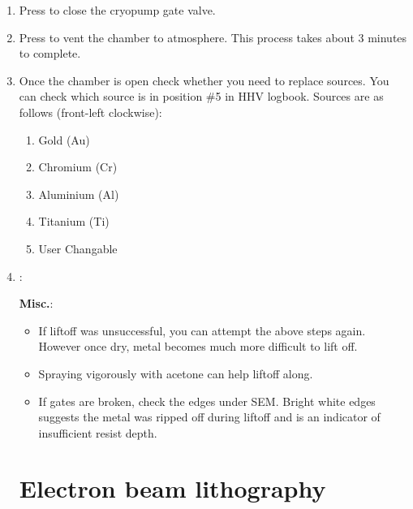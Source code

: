 \documentclass[12pt,a4paper]{report}
\begin{document}
\begin{enumerate}
\item Press  to close the cryopump gate valve.
\item Press  to vent the chamber to atmosphere. This process takes about 3 minutes to complete.
\item Once the chamber is open check whether you need to replace sources. You can check which source is in position \#5 in HHV logbook. Sources are as follows (front-left clockwise):
\begin{enumerate}[label=Source~\#\arabic*:]
  \item Gold (Au)
  \item Chromium (Cr)
  \item Aluminium (Al)
  \item Titanium (Ti)
  \item User Changable
\end{enumerate}
\item :
\begin{enumerate}
\end{enumerate}

\noindent \textbf{Misc.}:
\begin{itemize}
\item If liftoff was unsuccessful, you can attempt the above steps again. However once dry, metal becomes
much more difficult to lift off.
\item Spraying vigorously with acetone can help liftoff along.
\item If gates are broken, check the edges under SEM. Bright white edges suggests the metal was ripped
off during liftoff and is an indicator of insufficient resist depth.
\end{itemize}
\newpage

\section{Electron beam lithography}


\end{enumerate}
\end{document}

